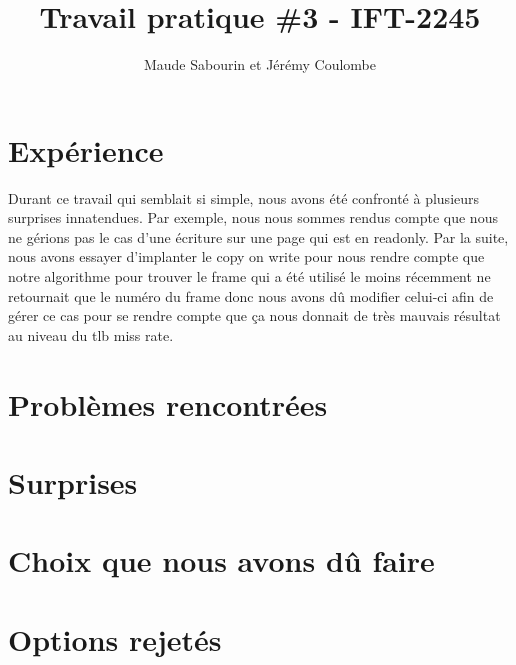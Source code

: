 \documentclass{article}
\title{Travail pratique \#3 - IFT-2245}
\author{Maude Sabourin et Jérémy Coulombe}
\begin{document}
\maketitle

\section{Expérience}
Durant ce travail qui semblait si simple, nous avons été confronté à plusieurs surprises innatendues. Par exemple, nous nous sommes rendus compte que nous ne gérions pas le cas d'une écriture sur une page qui est en readonly. Par la suite, nous avons essayer d'implanter le copy on write pour nous rendre compte que notre algorithme pour trouver le frame qui a été utilisé le moins récemment ne retournait que le numéro du frame donc nous avons dû modifier celui-ci afin de gérer ce cas pour se rendre compte que ça nous donnait de très mauvais résultat au niveau du tlb miss rate.

\section {Problèmes rencontrées}

\section{Surprises}

\section{Choix que nous avons dû faire}

\section{Options rejetés}
\end{document}
